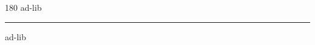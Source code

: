 
\begin{frame}
\begin{center}
\begin{turn}{180}
{\fontsize{2.5cm}{1em}\selectfont ad-lib}
\end{turn}
\vspace{1em}\par  
\hrule
\vspace{1em}\par  
{\fontsize{2.5cm}{1em}\selectfont ad-lib}
\end{center}
\end{frame}

